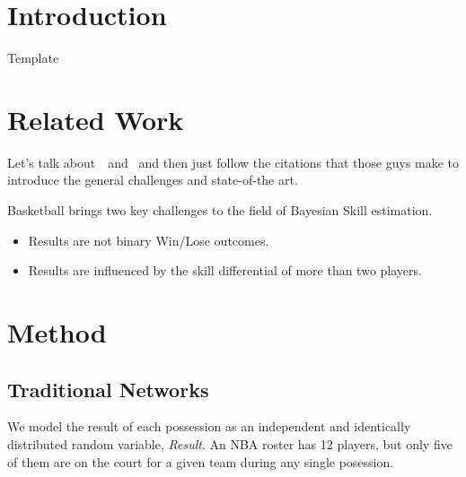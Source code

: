 \documentclass[10pt,twocolumn]{article}
\begin{document}


\section{Introduction}

  Template


\section{Related Work}

Let's talk about~\cite{herbrich2007trueskilltm}~and~\cite{coulom2008whole} and then just follow the citations that those guys make to introduce the general challenges and state-of-the art.

Basketball brings two key challenges to the field of Bayesian Skill estimation.
\begin{itemize}
\item Results are not binary Win/Lose outcomes.
\item Results are influenced by the skill differential of more than two players.
\end{itemize}



\section{Method}
\subsection{Traditional Networks}

We model the result of each possession as an independent and identically distributed random variable, \emph{Result}.
An NBA roster has 12 players, but only five of them are on the court for a given team during any single posession.
\end{document}
